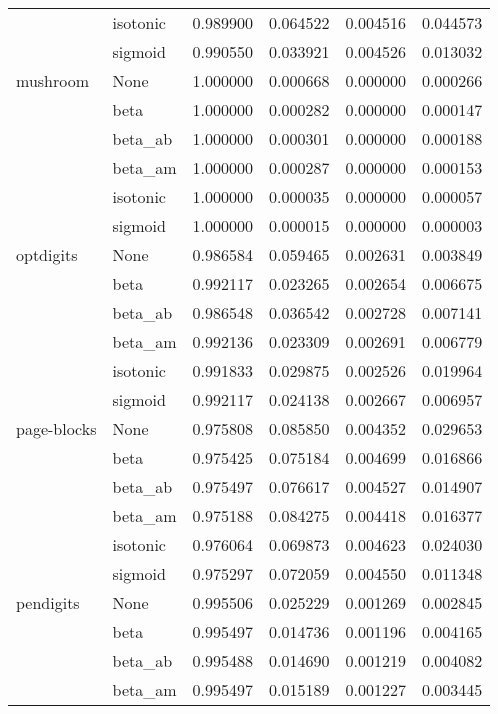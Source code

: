 \begin{tabular}{llrrrr}
        & isotonic &  0.989900 &  0.064522 &  0.004516 &  0.044573 \\
        & sigmoid &  0.990550 &  0.033921 &  0.004526 &  0.013032 \\
mushroom & None &  1.000000 &  0.000668 &  0.000000 &  0.000266 \\
        & beta &  1.000000 &  0.000282 &  0.000000 &  0.000147 \\
        & beta\_ab &  1.000000 &  0.000301 &  0.000000 &  0.000188 \\
        & beta\_am &  1.000000 &  0.000287 &  0.000000 &  0.000153 \\
        & isotonic &  1.000000 &  0.000035 &  0.000000 &  0.000057 \\
        & sigmoid &  1.000000 &  0.000015 &  0.000000 &  0.000003 \\
optdigits & None &  0.986584 &  0.059465 &  0.002631 &  0.003849 \\
        & beta &  0.992117 &  0.023265 &  0.002654 &  0.006675 \\
        & beta\_ab &  0.986548 &  0.036542 &  0.002728 &  0.007141 \\
        & beta\_am &  0.992136 &  0.023309 &  0.002691 &  0.006779 \\
        & isotonic &  0.991833 &  0.029875 &  0.002526 &  0.019964 \\
        & sigmoid &  0.992117 &  0.024138 &  0.002667 &  0.006957 \\
page-blocks & None &  0.975808 &  0.085850 &  0.004352 &  0.029653 \\
        & beta &  0.975425 &  0.075184 &  0.004699 &  0.016866 \\
        & beta\_ab &  0.975497 &  0.076617 &  0.004527 &  0.014907 \\
        & beta\_am &  0.975188 &  0.084275 &  0.004418 &  0.016377 \\
        & isotonic &  0.976064 &  0.069873 &  0.004623 &  0.024030 \\
        & sigmoid &  0.975297 &  0.072059 &  0.004550 &  0.011348 \\
pendigits & None &  0.995506 &  0.025229 &  0.001269 &  0.002845 \\
        & beta &  0.995497 &  0.014736 &  0.001196 &  0.004165 \\
        & beta\_ab &  0.995488 &  0.014690 &  0.001219 &  0.004082 \\
        & beta\_am &  0.995497 &  0.015189 &  0.001227 &  0.003445 \\

\end{tabular}
